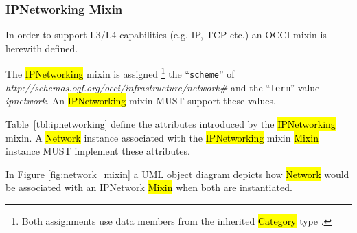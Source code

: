 \documentclass[10pt,a4paper]{article}
\begin{document}
\subsubsection{IPNetworking Mixin}

In order to support L3/L4 capabilities (e.g. IP, TCP etc.) an OCCI mixin is herewith defined. 

The \hl{IPNetworking} mixin is assigned%
\footnote{Both assignments use data members from the inherited \hl{Category}
type \cite{occi:core}.}
the ``{\tt scheme}'' of
\textit{http://schemas.ogf.org/occi/infrastructure/network\#} and the ``{\tt term}'' value 
\textit{ipnetwork}. An \hl{IPNetworking} mixin MUST support these values.

Table~\ref{tbl:ipnetworking} define the attributes introduced by the
\hl{IPNetworking} mixin.  A \hl{Network} instance associated with the
\hl{IPNetworking} mixin \hl{Mixin} instance MUST implement these attributes.


In Figure \ref{fig:network_mixin} a UML object diagram depicts how \hl{Network} would be associated with an 
IPNetwork \hl{Mixin} when both are instantiated.
\end{document}
